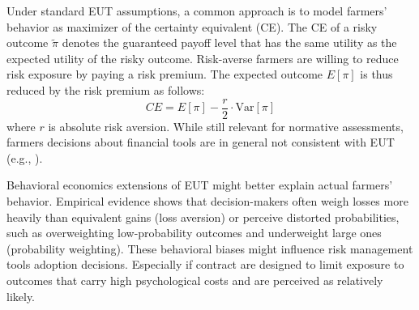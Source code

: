 \documentclass[12pt,a4paper]{article}
\begin{document}
Under standard EUT assumptions, a common approach is to model farmers' behavior as maximizer of the certainty equivalent (CE). The CE of a risky outcome $\tilde{\pi}$ denotes the guaranteed payoff level that has the same utility as the expected utility of the risky outcome. Risk-averse farmers are willing to reduce risk exposure by paying a risk premium. The expected outcome $E[\pi]$ is thus reduced by the risk premium as follows:
\begin{equation}
CE = E[\pi] - \frac{r}{2} \cdot \text{Var}[\pi]
\label{eq:CE}
\end{equation}
where $r$ is absolute risk aversion. While still relevant for normative assessments, farmers decisions about financial tools are in general not consistent with EUT (e.g., \citealp{Babcock2015}).

Behavioral economics extensions of EUT might better explain actual farmers' behavior. Empirical evidence shows that decision-makers often weigh losses more heavily than equivalent gains (loss aversion) or perceive distorted probabilities, such as overweighting low-probability outcomes and underweight large ones (probability weighting). These behavioral biases might influence risk management tools adoption decisions. Especially if contract are designed to limit exposure to outcomes that carry high psychological costs and are perceived as relatively likely.
\end{document}
